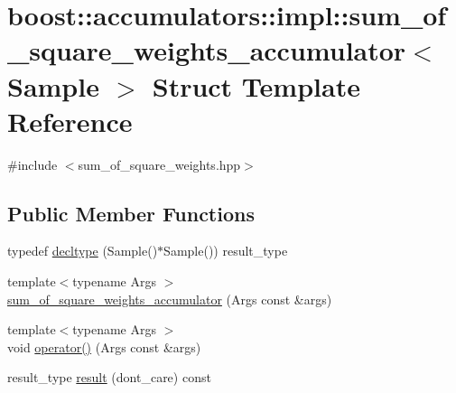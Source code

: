 \hypertarget{structboost_1_1accumulators_1_1impl_1_1sum__of__square__weights__accumulator}{\section{boost\-:\-:accumulators\-:\-:impl\-:\-:sum\-\_\-of\-\_\-square\-\_\-weights\-\_\-accumulator$<$ Sample $>$ Struct Template Reference}
\label{structboost_1_1accumulators_1_1impl_1_1sum__of__square__weights__accumulator}
}


{\ttfamily \#include $<$sum\-\_\-of\-\_\-square\-\_\-weights.\-hpp$>$}

\subsection*{Public Member Functions}
\begin{DoxyCompactItemize}
\item 
typedef \hyperlink{structboost_1_1accumulators_1_1impl_1_1sum__of__square__weights__accumulator_a13c60c3dc8cdeea5ca5b7d1a6a12ee1a}{decltype} (Sample()$\ast$Sample()) result\-\_\-type
\item 
{\footnotesize template$<$typename Args $>$ }\\\hyperlink{structboost_1_1accumulators_1_1impl_1_1sum__of__square__weights__accumulator_a25e5303bcf9f1136290fa80321c328b1}{sum\-\_\-of\-\_\-square\-\_\-weights\-\_\-accumulator} (Args const \&args)
\item 
{\footnotesize template$<$typename Args $>$ }\\void \hyperlink{structboost_1_1accumulators_1_1impl_1_1sum__of__square__weights__accumulator_a052432b8ef1d629762aa19a582d7b60a}{operator()} (Args const \&args)
\item 
result\-\_\-type \hyperlink{structboost_1_1accumulators_1_1impl_1_1sum__of__square__weights__accumulator_a3611a3f12c9e842e90d5d883ced69b3b}{result} (dont\-\_\-care) const 
\end{DoxyCompactItemize}


